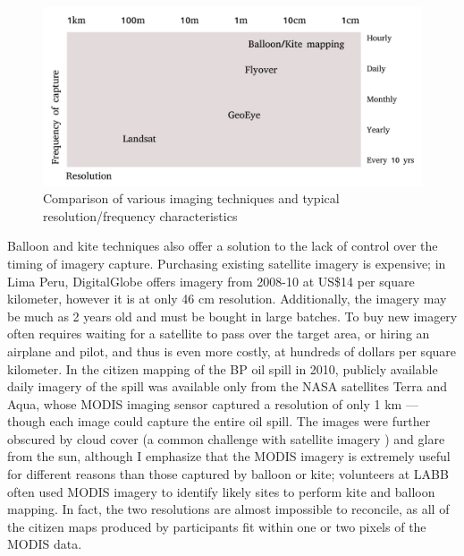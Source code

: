\documentclass[11pt,oneside,notitlepage]{report}
\begin{document}
{{\begin{figure}[h]
  \begin{center}
	\includegraphics[width=1\textwidth]{diagrams/resolution-frequency.pdf}
	\caption{Comparison of various imaging techniques and typical resolution/frequency characteristics}
  \end{center}
\end{figure}

Balloon and kite techniques also offer a solution to the lack of control over the timing of imagery capture. Purchasing existing satellite imagery is expensive; in Lima Peru, DigitalGlobe offers imagery from 2008-10 at US\$14 per square kilometer, however it is at only 46 cm resolution. Additionally, the imagery may be much as 2 years old and must be bought in large batches. \cite{digitalglobe2010mapmart} To buy new imagery often requires waiting for a satellite to pass over the target area, or hiring an airplane and pilot, and thus is even more costly, at hundreds of dollars per square kilometer. \cite{mumby1999cost} In the citizen mapping of the BP oil spill in 2010, publicly available daily imagery of the spill was available only from the NASA satellites Terra and Aqua, whose \ac{MODIS} imaging sensor captured a resolution of only 1 km --- though each image could capture the entire oil spill. The images were further obscured by cloud cover (a common challenge with satellite imagery \cite{miyamoto2004use}) and glare from the sun, although I emphasize that the \ac{MODIS} imagery is extremely useful for different reasons than those captured by balloon or kite; volunteers at \ac{LABB} often used \ac{MODIS} imagery to identify likely sites to perform kite and balloon mapping. In fact, the two resolutions are almost impossible to reconcile, as all of the citizen maps produced by participants fit within one or two pixels of the \ac{MODIS} data.

}}
\end{document}
